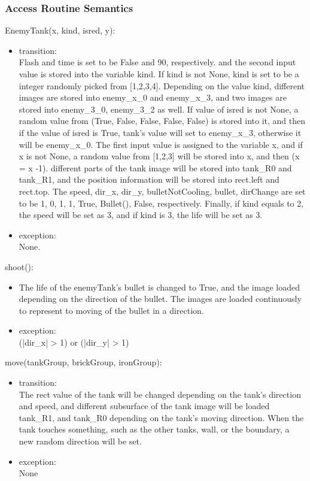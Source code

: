 \documentclass[12pt, titlepage]{article}
\begin{document}
		\subsubsection{Access Routine Semantics}
        EnemyTank(x, kind,  isred, y):
        \begin{itemize}
        \item transition:\\ Flash and time is set to be False and 90, respectively. and the second input value is stored into the variable kind. If kind is not None, kind is set to be a integer randomly picked from [1,2,3,4]. Depending on the value kind, different images are stored into enemy\_x\_0 and enemy\_x\_3, and two images are stored into enemy\_3\_0, enemy\_3\_2 as well. If value of isred is not None, a random value from (True, False, False, False, False) is stored into it, and then if the value of isred is True, tank's value will set to enemy\_x\_3, otherwise it will be enemy\_x\_0. The first input value is assigned to the variable x, and if x is not None, a random value from [1,2,3] will be stored into x, and then (x = x -1). different parts of the tank image will be stored into tank\_R0 and tank\_R1, and the position information will be stored into rect.left and rect.top. The speed, dir\_x, dir\_y, bulletNotCooling, bullet, dirChange are set to be 1, 0, 1, 1, True, Bullet(), False,  respectively. Finally, if kind equals to 2, the speed will be set as 3, and if kind is 3, the life will be set as 3.
        \item exception:\\None.
        \end{itemize}
        shoot():
        \begin{itemize}
        \item  The life of the enemyTank's bullet is changed to True, and the image loaded depending on the direction of the bullet. The images are loaded continuously to represent to moving of the bullet in a direction.
        \item exception:\\ (|dir\_x| > 1) or (|dir\_y| > 1)
        \end{itemize}
        move(tankGroup, brickGroup, ironGroup):
        \begin{itemize}
        \item transition:\\ The rect value of the tank will be changed depending on the tank's direction and speed, and different subsurface of the tank image will be loaded tank\_R1, and tank\_R0 depending on the tank's moving direction. When the tank touches something, such as the other tanks, wall, or the boundary, a new random direction will be set.
        \item exception:\\None
        \end{itemize}
\end{document}
